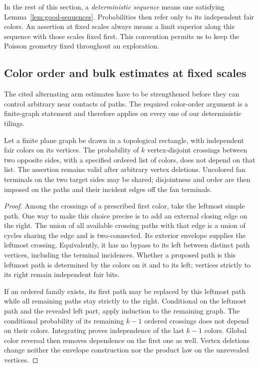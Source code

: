 In the rest of this section, a \emph{deterministic sequence} means
one satisfying Lemma~\ref{lem:good-sequences}.  Probabilities then
refer only to its independent fair colors.  An assertion at fixed
scales always means a limit superior along this sequence with
those scales fixed first.  This convention permits us to keep the
Poisson geometry fixed throughout an exploration.

\subsection{Color order and bulk estimates at fixed scales}

The cited alternating arm estimates have to be strengthened before
they can control arbitrary near contacts of paths.  The required
color-order argument is a finite-graph statement and therefore
applies on every one of our deterministic tilings.

\begin{lemma}\label{lem:rectangle-colors}
Let a finite plane graph be drawn in a topological rectangle, with
independent fair colors on its vertices.  The probability of $k$
vertex-disjoint crossings between two opposite sides, with a
specified ordered list of colors, does not depend on that list.
The assertion remains valid after arbitrary vertex deletions.
Uncolored fan terminals on the two target sides may be shared;
disjointness and order are then imposed on the paths and their
incident edges off the fan terminals.
\end{lemma}

\begin{proof}
Among the crossings of a prescribed first color, take the leftmost
simple path.  One way to make this choice precise is to add an
external closing edge on the right.  The union of all available
crossing paths with that edge is a union of cycles sharing the
edge and is two-connected.  Its exterior envelope supplies the
leftmost crossing.  Equivalently, it has no bypass to its left
between distinct path vertices, including the terminal incidences.
Whether a proposed path is this leftmost path is determined by
the colors on it and to its left; vertices strictly to its right
remain independent fair bits.

If an ordered family exists, its first path may be replaced by
this leftmost path while all remaining paths stay strictly to
the right.  Conditional on the leftmost path and the revealed
left part, apply induction to the remaining graph.  The
conditional probability of its remaining $k-1$ ordered crossings
does not depend on their colors.  Integrating proves independence
of the last $k-1$ colors.  Global color reversal then removes
dependence on the first one as well.  Vertex deletions change
neither the envelope construction nor the product law on the
unrevealed vertices.
\end{proof}


